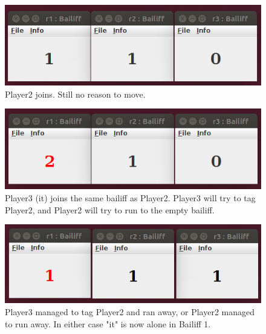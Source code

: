 \documentclass[conference, a4paper]{IEEEtran}
\begin{document}
\begin{figure}[h!]
	\centering
	\includegraphics[scale=0.4]{110}
	\caption{Player2 joins. Still no reason to move.}
	\label{fig110}
\end{figure}

\begin{figure}[h!]
	\centering
	\includegraphics[scale=0.4]{210.png}
	\caption{Player3 (it) joins the same bailiff as Player2. Player3 will try to tag Player2, and Player2 will try to run to the empty bailiff.}
	\label{fig210}
\end{figure}

\begin{figure}[h!]
	\centering
	\includegraphics[scale=0.4]{111}
	\caption{Player3 managed to tag Player2 and ran away, or Player2 managed to run away. In either case "it" is now alone in Bailiff 1.}
	\label{fig111}
\end{figure}
\end{document}
